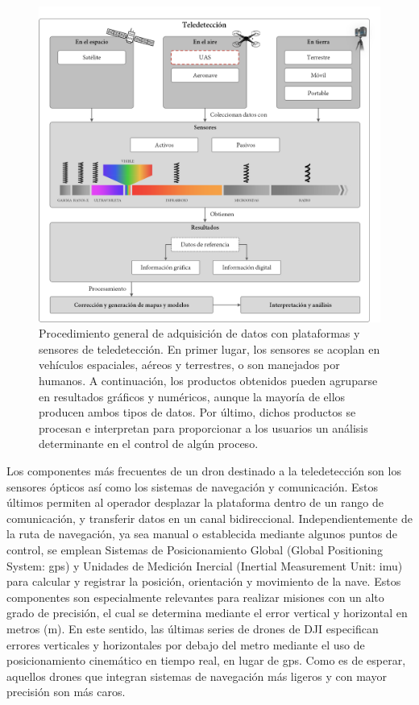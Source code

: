 \begin{figure}[!ht]
	\includegraphics{figs/introduction/introduction_scheme_spanish.png}
	\caption{Procedimiento general de adquisición de datos con plataformas y sensores de teledetección. En primer lugar, los sensores se acoplan en vehículos espaciales, aéreos y terrestres, o son manejados por humanos. A continuación, los productos obtenidos pueden agruparse en resultados gráficos y numéricos, aunque la mayoría de ellos producen ambos tipos de datos. Por último, dichos productos se procesan e interpretan para proporcionar a los usuarios un análisis determinante en el control de algún proceso. }
    \label{fig:introduction_scheme_spanish}
\end{figure}

Los componentes más frecuentes de un dron destinado a la teledetección son los sensores ópticos así como los sistemas de navegación y comunicación. Estos últimos permiten al operador desplazar la plataforma dentro de un rango de comunicación, y transferir datos en un canal bidireccional. Independientemente de la ruta de navegación, ya sea manual o establecida mediante algunos puntos de control, se emplean Sistemas de Posicionamiento Global (Global Positioning System: \acrshort{gps}) y Unidades de Medición Inercial (Inertial Measurement Unit: \acrshort{imu}) para calcular y registrar la posición, orientación y movimiento de la nave. Estos componentes son especialmente relevantes para realizar misiones con un alto grado de precisión, el cual se determina mediante el error vertical y horizontal en metros (\si{\meter}). En este sentido, las últimas series de drones de DJI especifican errores verticales y horizontales por debajo del metro mediante el uso de posicionamiento cinemático en tiempo real, en lugar de \acrshort{gps}. Como es de esperar, aquellos drones que integran sistemas de navegación más ligeros y con mayor precisión son más caros.    

